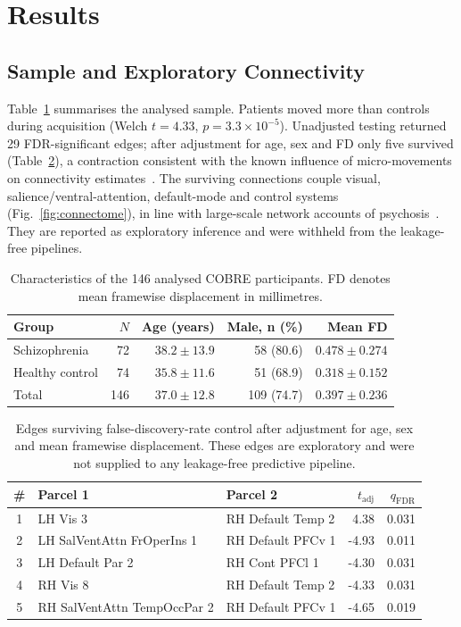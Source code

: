 \documentclass[runningheads]{llncs}
\begin{document}
\section{Results}

\subsection{Sample and Exploratory Connectivity}
Table~\ref{tab:cohort} summarises the analysed sample. Patients moved more than controls
during acquisition (Welch $t = 4.33$, $p = 3.3 \times 10^{-5}$). Unadjusted testing
returned 29 FDR-significant edges; after adjustment for age, sex and FD only five
survived (Table~\ref{tab:edges}), a contraction consistent with the known influence of
micro-movements on connectivity estimates~\cite{Power2012}. The surviving connections
couple visual, salience/ventral-attention, default-mode and control systems
(Fig.~\ref{fig:connectome}), in line with large-scale network accounts of
psychosis~\cite{Menon2011}. They are reported as exploratory inference and were withheld
from the leakage-free pipelines.

\begin{table}[t]
\centering
\caption{Characteristics of the 146 analysed COBRE participants. FD denotes mean
framewise displacement in millimetres.}
\label{tab:cohort}
\begin{tabular}{lrrrr}
\toprule
Group & $N$ & Age (years) & Male, n (\%) & Mean FD \\
\midrule
Schizophrenia   & 72  & $38.2 \pm 13.9$ & 58 (80.6)  & $0.478 \pm 0.274$ \\
Healthy control & 74  & $35.8 \pm 11.6$ & 51 (68.9)  & $0.318 \pm 0.152$ \\
\midrule
Total           & 146 & $37.0 \pm 12.8$ & 109 (74.7) & $0.397 \pm 0.236$ \\
\bottomrule
\end{tabular}
\end{table}

\begin{table}[t]
\centering
\caption{Edges surviving false-discovery-rate control after adjustment for age, sex and
mean framewise displacement. These edges are exploratory and were not supplied to any
leakage-free predictive pipeline.}
\label{tab:edges}
\begin{tabular}{cllrr}
\toprule
\# & Parcel 1 & Parcel 2 & $t_{\mathrm{adj}}$ & $q_{\mathrm{FDR}}$ \\
\midrule
1 & LH Vis 3                     & RH Default Temp 2 & 4.38  & 0.031 \\
2 & LH SalVentAttn FrOperIns 1   & RH Default PFCv 1 & -4.93 & 0.011 \\
3 & LH Default Par 2             & RH Cont PFCl 1    & -4.30 & 0.031 \\
4 & RH Vis 8                     & RH Default Temp 2 & -4.33 & 0.031 \\
5 & RH SalVentAttn TempOccPar 2  & RH Default PFCv 1 & -4.65 & 0.019 \\
\bottomrule
\end{tabular}
\end{table}
\end{document}
